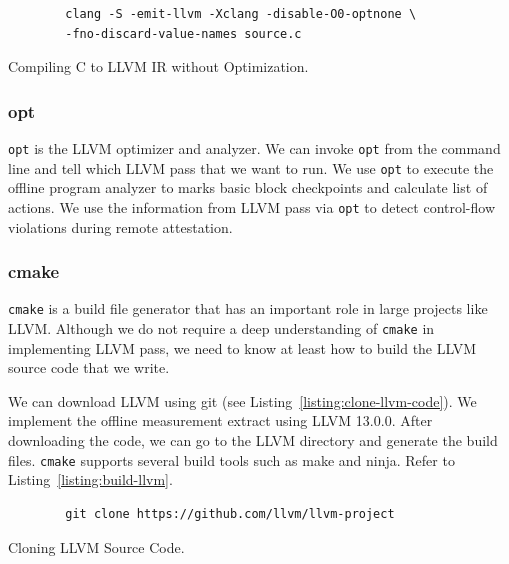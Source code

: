 \begin{listing}[h!]
    \begin{verbatim}
        clang -S -emit-llvm -Xclang -disable-O0-optnone \
        -fno-discard-value-names source.c
    \end{verbatim}
    \caption{Compiling C to LLVM IR without Optimization.}    
    \label{listing:compile-llvm-to-ir-no-opt}
\end{listing}

\subsubsection{opt}

\texttt{opt} is the LLVM optimizer and analyzer. We can invoke \texttt{opt} from
the command line and tell which LLVM pass that we want to run. We use
\texttt{opt} to execute the offline program analyzer to marks basic block
checkpoints and calculate list of actions. We use the information from LLVM pass
via \texttt{opt} to detect control-flow violations during remote attestation.

\subsubsection{cmake}

\texttt{cmake} is a build file generator that has an important role in large
projects like LLVM. Although we do not require a deep understanding of
\texttt{cmake} in implementing LLVM pass, we need to know at least how to build
the LLVM source code that we write.

We can download LLVM using git (see Listing~\ref{listing:clone-llvm-code}). We
implement the offline measurement extract using LLVM 13.0.0.  After downloading
the code, we can go to the LLVM directory and generate the build files.
\texttt{cmake} supports several build tools such as make and ninja. Refer to
Listing~\ref{listing:build-llvm}.

\begin{listing}[h!]
    \begin{verbatim}
        git clone https://github.com/llvm/llvm-project
    \end{verbatim}
    \caption{Cloning LLVM Source Code.}    
    \label{listing:clone-llvm-code}
\end{listing}


